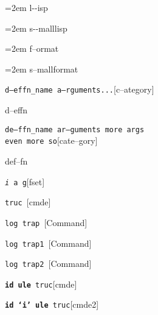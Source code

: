 \documentclass{book}
\begin{document}
\par\begingroup\obeylines\obeyspaces\frenchspacing\leftskip=2em\relax\parskip=0pt\relax\ttfamily{}%
l{-}{-}isp
\endgroup{}%

\par\begingroup\obeylines\obeyspaces\frenchspacing\leftskip=2em\relax\parskip=0pt\relax\ttfamily\footnotesize{}%
s{-}{-}malllisp
\endgroup{}%

\par\begingroup\obeylines\obeyspaces\frenchspacing\leftskip=2em\relax\parskip=0pt\relax{}%
f--ormat
\endgroup{}%

\par\begingroup\obeylines\obeyspaces\frenchspacing\leftskip=2em\relax\parskip=0pt\relax\footnotesize{}%
s--mallformat
\endgroup{}%

\noindent\texttt\bgroup{}d--effn\_name a--rguments...\egroup{}\hfill[c--ategory]



%
d--effn

\noindent\texttt\bgroup{}de--ffn\_name ar--guments    more args \leavevmode{}\\ even more so\egroup{}\hfill[cate--gory]



%
def--fn

\noindent\texttt\bgroup{}\emph{i} a g\egroup{}\hfill[fset]



%
%
\noindent\texttt\bgroup{}truc \egroup{}\hfill[cmde]



%
\noindent\texttt\bgroup{}log trap \egroup{}\hfill[Command]



%
\noindent\texttt\bgroup{}log trap1 \egroup{}\hfill[Command]



%
\noindent\texttt\bgroup{}log trap2 \egroup{}\hfill[Command]



%
\noindent\texttt\bgroup{}\textbf{id ule} truc\egroup{}\hfill[cmde]



%
\noindent\texttt\bgroup{}\textbf{id `\texttt{i}' ule} truc\egroup{}\hfill[cmde2]
\end{document}
